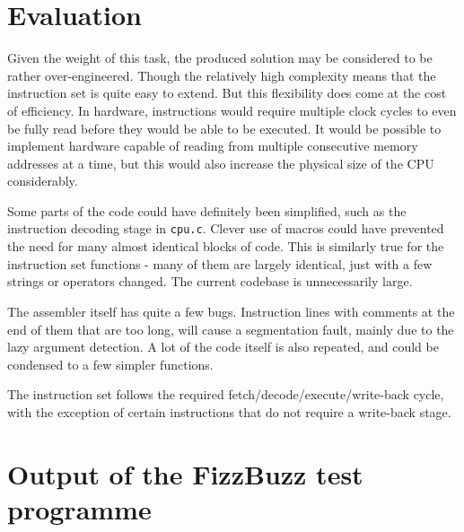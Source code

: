 \documentclass[a4paper,11pt]{article}
\begin{document}
\section{Evaluation}
    Given the weight of this task, the produced solution may be considered to be rather over-engineered. Though the relatively high complexity means that the instruction set is quite easy to extend. But this flexibility does come at the cost of efficiency. In hardware, instructions would require multiple clock cycles to even be fully read before they would be able to be executed. It would be possible to implement hardware capable of reading from multiple consecutive memory addresses at a time, but this would also increase the physical size of the CPU considerably.
    
    Some parts of the code could have definitely been simplified, such as the instruction decoding stage in \lstinline{cpu.c}. Clever use of macros could have prevented the need for many almost identical blocks of code. This is similarly true for the instruction set functions - many of them are largely identical, just with a few strings or operators changed. The current codebase is unnecessarily large.
    
    The assembler itself has quite a few bugs. Instruction lines with comments at the end of them that are too long, will cause a segmentation fault, mainly due to the lazy argument detection. A lot of the code itself is also repeated, and could be condensed to a few simpler functions.
    
    The instruction set follows the required fetch/decode/execute/write-back cycle, with the exception of certain instructions that do not require a write-back stage.
    
\newpage

\begin{appendices}
    \label{appendix}
    \section{Output of the FizzBuzz test programme}
    \label{dat:fizzbuzz}
\end{appendices}
\newpage



\end{document}
